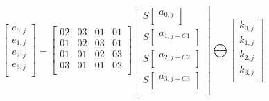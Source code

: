 \documentclass{article}
\begin{document}


\[
\begin{bmatrix}
e_{0,j} \\
e_{1,j} \\
e_{2,j} \\
e_{3,j} \\
\end{bmatrix}
=
\begin{bmatrix}
02 & 03 & 01 & 01 \\
01 & 02 & 03 & 01 \\
01 & 01 & 02 & 03 \\
03 & 01 & 01 & 02 \\
\end{bmatrix}
\begin{bmatrix}
S
\begin{bmatrix}
a_{0,j} \\
\end{bmatrix} \\
S
\begin{bmatrix}
a_{1,j-C1} \\
\end{bmatrix} \\
S
\begin{bmatrix}
a_{2,j-C2} \\
\end{bmatrix} \\
S
\begin{bmatrix}
a_{3,j-C3} \\
\end{bmatrix}\\
\end{bmatrix}
\bigoplus
\begin{bmatrix}
k_{0,j} \\
k_{1,j} \\
k_{2,j} \\
k_{3,j} \\
\end{bmatrix}
\]
\end{document}
